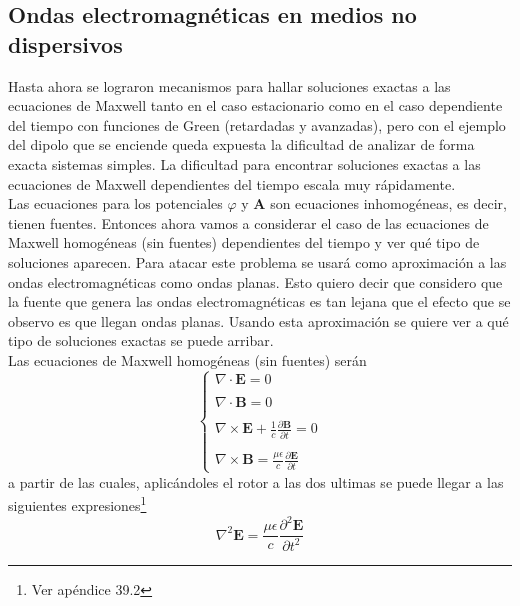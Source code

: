 \subsection{Ondas electromagnéticas en medios no dispersivos}
Hasta ahora se lograron mecanismos para hallar soluciones exactas a las ecuaciones de Maxwell tanto en el caso estacionario como en el caso dependiente del tiempo con funciones de Green (retardadas y avanzadas), pero con el ejemplo del dipolo que se enciende queda expuesta la dificultad de analizar de forma exacta sistemas simples. La dificultad para encontrar soluciones exactas a las ecuaciones de Maxwell dependientes del tiempo escala muy rápidamente.\\
\indent Las ecuaciones para los potenciales $\varphi$ y $\textbf{A}$ son ecuaciones inhomogéneas, es decir, tienen fuentes. Entonces ahora vamos a considerar el caso de las ecuaciones de Maxwell homogéneas (sin fuentes) dependientes del tiempo y ver qué tipo de soluciones aparecen. Para atacar este problema se usará como aproximación a las ondas electromagnéticas como ondas planas. Esto quiero decir que considero que la fuente que genera las ondas electromagnéticas es tan lejana que el efecto que se observo es que llegan ondas planas. Usando esta aproximación se quiere ver a qué tipo de soluciones exactas se puede arribar.\\
\indent Las ecuaciones de Maxwell homogéneas (sin fuentes) serán
\begin{equation*}
    \left\{
        \begin{matrix}
            \nabla \cdot \textbf{E} = 0 \\
            \\
            \nabla \cdot \textbf{B} = 0 \\
            \\
            \nabla \times \textbf{E} 
            + 
            \frac{1}{c}\frac{\partial \textbf{B}}{\partial t} = 0\\
            \\
            \nabla \times \textbf{B} 
            = \frac{\mu \epsilon}{c} \frac{\partial \textbf{E}}{\partial t}
        \end{matrix}
    \right.
\end{equation*}
a partir de las cuales, aplicándoles el rotor a las dos ultimas se puede llegar a las siguientes expresiones\footnote{Ver apéndice 39.2}
\begin{equation*}
    \nabla^{2}\textbf{E} 
    = \frac{\mu\epsilon}{c}\frac{\partial^{2}\textbf{E}}{\partial t^{2}}
\end{equation*}
